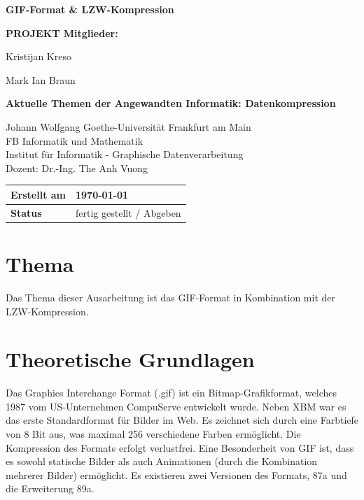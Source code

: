 \documentclass[11pt,a4paper]{article}
\begin{document}
	
	\begin{titlepage}
		\centering
		\vspace*{2cm}
		{\Huge \textbf{GIF-Format \& LZW-Kompression} \par}
		\vspace{1cm}
		{\Large \textbf{PROJEKT Mitglieder:} \par}
		\Large{Kristijan Kreso} \par
		\Large{Mark Ian Braun} \par
		\vspace{2cm}
		{\Large \textbf{Aktuelle Themen der Angewandten Informatik: Datenkompression} \par}
		\vspace{0.5cm}
		Johann Wolfgang Goethe-Universität Frankfurt am Main \\
		FB Informatik und Mathematik \\
		Institut für Informatik - Graphische Datenverarbeitung \\
		\vspace{0.5cm}
		Dozent: Dr.-Ing. The Anh Vuong
		\vspace{2cm}
		
		\begin{tabular}{|l|l|}
			\hline
			\textbf{Erstellt am} & \today \\ \hline
			\textbf{Status} & fertig gestellt / Abgeben \\ \hline
		\end{tabular}
		\vfill
	\end{titlepage}
	
	\tableofcontents
	\newpage
	
	
	\section{Thema}
	Das Thema dieser Ausarbeitung ist das GIF-Format in Kombination mit der LZW-Kompression.
	
	\section{Theoretische Grundlagen}
	Das Graphics Interchange Format (.gif) ist ein Bitmap-Grafikformat, welches 1987 vom US-Unternehmen CompuServe entwickelt wurde. Neben XBM war es das erste Standardformat für Bilder im Web. Es zeichnet sich durch eine Farbtiefe von 8 Bit aus, was maximal 256 verschiedene Farben ermöglicht. Die Kompression des Formats erfolgt verlustfrei. Eine Besonderheit von GIF ist, dass es sowohl statische Bilder als auch Animationen (durch die Kombination mehrerer Bilder) ermöglicht. Es existieren zwei Versionen des Formats, 87a und die Erweiterung 89a.
	
\end{document}
